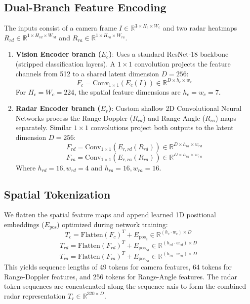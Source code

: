\documentclass[conference]{IEEEtran}
\begin{document}
\subsection{Dual-Branch Feature Encoding}
The inputs consist of a camera frame $I \in \mathbb{R}^{3 \times H_c \times W_c}$ and two radar heatmaps $R_{rd} \in \mathbb{R}^{1 \times H_{rd} \times W_{rd}}$ and $R_{ra} \in \mathbb{R}^{1 \times H_{ra} \times W_{ra}}$.
\begin{enumerate}
\item \textbf{Vision Encoder branch ($E_c$)}: Uses a standard ResNet-18 backbone (stripped classification layers). A $1\times1$ convolution projects the feature channels from 512 to a shared latent dimension $D=256$:
\begin{equation}
F_c = \text{Conv}_{1\times1}(E_c(I)) \in \mathbb{R}^{D \times h_c \times w_c}
\end{equation}
For $H_c=W_c=224$, the spatial feature dimensions are $h_c=w_c=7$.
\item \textbf{Radar Encoder branch ($E_r$)}: Custom shallow 2D Convolutional Neural Networks process the Range-Doppler ($R_{rd}$) and Range-Angle ($R_{ra}$) maps separately. Similar $1\times1$ convolutions project both outputs to the latent dimension $D=256$:
\begin{equation}
F_{rd} = \text{Conv}_{1\times1}(E_{r,rd}(R_{rd})) \in \mathbb{R}^{D \times h_{rd} \times w_{rd}}
\end{equation}
\begin{equation}
F_{ra} = \text{Conv}_{1\times1}(E_{r,ra}(R_{ra})) \in \mathbb{R}^{D \times h_{ra} \times w_{ra}}
\end{equation}
Where $h_{rd}=16, w_{rd}=4$ and $h_{ra}=16, w_{ra}=16$.
\end{enumerate}

\subsection{Spatial Tokenization}
We flatten the spatial feature maps and append learned 1D positional embeddings ($E_{\text{pos}}$) optimized during network training:
\begin{equation}
T_c = \text{Flatten}(F_c)^T + E_{\text{pos}_c} \in \mathbb{R}^{(h_c \cdot w_c) \times D}
\end{equation}
\begin{equation}
T_{rd} = \text{Flatten}(F_{rd})^T + E_{\text{pos}_{rd}} \in \mathbb{R}^{(h_{rd} \cdot w_{rd}) \times D}
\end{equation}
\begin{equation}
T_{ra} = \text{Flatten}(F_{ra})^T + E_{\text{pos}_{ra}} \in \mathbb{R}^{(h_{ra} \cdot w_{ra}) \times D}
\end{equation}
This yields sequence lengths of 49 tokens for camera features, 64 tokens for Range-Doppler features, and 256 tokens for Range-Angle features. The radar token sequences are concatenated along the sequence axis to form the combined radar representation $T_r \in \mathbb{R}^{320 \times D}$.
\end{document}
